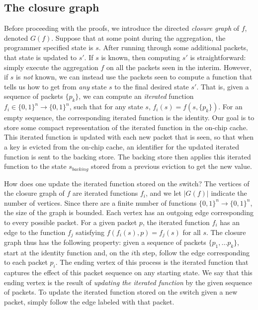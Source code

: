 \subsection{The closure graph}

Before proceeding with the proofs, we introduce the directed \emph{closure graph} of $f$, denoted $G(f)$. Suppose that at some point during the aggregation, 
the programmer specified state is $s$. After running through some additional packets, that state is updated to $s'$. If $s$ is known, then computing
$s'$ is straightforward: simply execute the aggregation $f$ on all the packets seen in the interim. However, if $s$ is \emph{not} known, we can instead
use the packets seen to compute a function that tells us how to get from \emph{any} state $s$ to the final desired state $s'$. That is, given a sequence of packets $\{p_k\}$,
we can compute an \emph{iterated} function $f_i \in \{0,1\}^n \rightarrow \{0,1\}^n$, such that for any state $s$, $f_i(s) = f(s, \{p_k\})$. For an empty sequence, the corresponding iterated function is the identity.
Our goal is to store some compact representation of the iterated function in the on-chip cache. This iterated function is updated with each new packet that is seen, so that when a key is evicted from the on-chip cache,
an identifier for the updated iterated function is sent to the backing store. The backing store then applies this iterated function to the state $s_{backing}$ stored from a previous eviction to get the new value.

How does one update the iterated function stored on the switch? The vertices of the closure graph of $f$ are iterated functions $f_i$, and we let $|G(f)|$ indicate the number of vertices. Since there are a finite number of functions $\{0, 1\}^n \rightarrow \{0, 1\}^n$, the size of the graph is bounded.
Each vertex has an outgoing edge corresponding to every possible packet. For a given packet $p$, the iterated function $f_i$ has an edge to the function $f_j$ satisfying $f(f_i(s), p) = f_j(s)$ for all $s$.
The closure graph thus has the following property: given a sequence of packets $\{p_1, \ldots p_k\}$, start at the identity function and, on the $i$th step, follow the edge corresponding to each packet $p_i$. The ending vertex of this process is the iterated function that captures the effect of this packet sequence on any starting state. We say that this ending vertex is the result of \emph{updating the iterated function} by the given sequence of packets. To update the iterated function stored on the switch given a new packet, simply follow the edge labeled with that packet.

